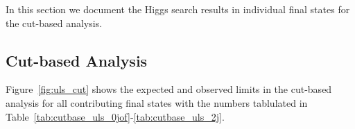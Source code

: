In this section we document the Higgs search results in individual final states for the cut-based analysis.  

\subsection{Cut-based Analysis}

Figure~\ref{fig:uls_cut} shows the expected and observed limits in the cut-based analysis 
for all contributing final states with the numbers tablulated in Table~\ref{tab:cutbase_uls_0jof}-\ref{tab:cutbase_uls_2j}. 

\begin{figure}[!hbtp]
\centering
{}
\centering
{} \\
\end{figure}
